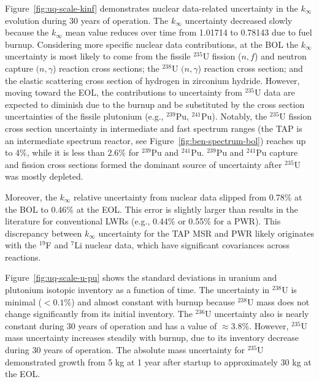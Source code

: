 Figure~\ref{fig:uq-scale-kinf} demonstrates nuclear data-related uncertainty 
in the $k_{\infty}$ evolution during 30 years of operation. The $k_{\infty}$  
uncertainty decreased slowly because the $k_{\infty}$ mean value reduces over 
time from 1.01714 to 0.78143 due to fuel burnup. Considering more specific 
nuclear data contributions, at the \gls{BOL} the $k_{\infty}$ uncertainty is 
most likely to come from the fissile $^{235}$U fission ($n,f$) and neutron 
capture $(n,\gamma$) reaction cross sections; the $^{238}$U $(n,\gamma$) 
reaction cross section; and the elastic scattering cross section of hydrogen 
in zirconium hydride. However, moving toward the \gls{EOL}, the contributions 
to uncertainty from $^{235}$U data are expected to diminish due to the burnup 
and be substituted by the cross section uncertainties of the fissile plutonium 
(e.g., $^{239}$Pu, $^{241}$Pu). Notably, the $^{235}$U fission cross section 
uncertainty in intermediate and fast spectrum ranges (the \gls{TAP} is an
intermediate spectrum reactor, see Figure~\ref{fig:ben-spectrum-bol}) reaches 
up to 4\%, while it is less than 2.6\% for $^{239}$Pu and $^{241}$Pu. 
$^{239}$Pu and $^{241}$Pu capture and fission cross sections formed the 
dominant source of uncertainty after $^{235}$U was mostly depleted. 

Moreover, the $k_{\infty}$ relative uncertainty from nuclear data slipped 
from 0.78\% at the \gls{BOL} to 0.46\% at the \gls{EOL}. This error is 
slightly larger than results in the literature for conventional \glspl{LWR} 
(e.g., 0.44\% \cite{williams_statistical_2013} or 0.55\% 
\cite{campolina_uncertainty_2018} for a \gls{PWR}). This discrepancy between 
$k_{\infty}$ uncertainty for the \gls{TAP} \gls{MSR} and \gls{PWR} likely 
originates with the $^{19}$F and $^{7}$Li nuclear data, which have significant 
covariances across reactions.

Figure~\ref{fig:uq-scale-u-pu} shows the standard deviations in uranium and 
plutonium isotopic inventory as a function of time. The uncertainty in 
$^{238}$U is minimal ($<0.1$\%) and almost constant with burnup because 
$^{238}$U mass does not change significantly from its initial inventory. The 
$^{236}$U uncertainty also is nearly constant during 30 years of operation and 
has a value of $\approx3.8$\%. However, $^{235}$U mass uncertainty increases 
steadily with burnup, due to its inventory decrease during 30 years of 
operation. The absolute mass uncertainty for $^{235}$U demonstrated growth 
from 5 kg at 1 year after startup to approximately 30 kg at the \gls{EOL}.

